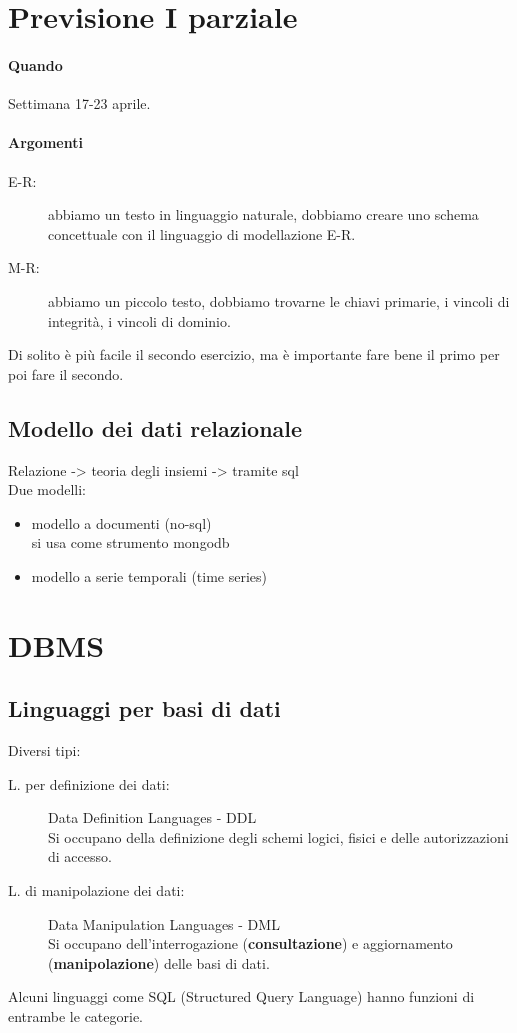 \chapter{Previsione I parziale}
\subsubsection{Quando}
Settimana 17-23 aprile.

\subsubsection{Argomenti}
\begin{description}
    \item[E-R:] abbiamo un testo in linguaggio naturale, dobbiamo creare uno schema concettuale con il linguaggio di modellazione E-R.
    \item[M-R:] abbiamo un piccolo testo, dobbiamo trovarne le chiavi primarie, i vincoli di integrità, i vincoli di dominio. 
\end{description}
Di solito è più facile il secondo esercizio, ma è importante fare bene il primo per poi fare il secondo.

\section{Modello dei dati relazionale}
Relazione -> teoria degli insiemi -> tramite sql
\\Due modelli:
\begin{itemize}
    \item modello a documenti (no-sql)
    \\si usa come strumento mongodb
    \item modello a serie temporali (time series)
\end{itemize}

\chapter{DBMS}
\section{Linguaggi per basi di dati}
Diversi tipi:
\begin{description}
    \item[L. per definizione dei dati:] Data Definition Languages - DDL
    \\ Si occupano della definizione degli schemi logici, fisici e delle autorizzazioni di accesso.
    \item[L. di manipolazione dei dati:] Data Manipulation Languages - DML
    \\Si occupano dell'interrogazione (\textbf{consultazione}) e aggiornamento (\textbf{manipolazione}) delle basi di dati.
\end{description}
Alcuni linguaggi come SQL (Structured Query Language) hanno funzioni di entrambe le categorie.

